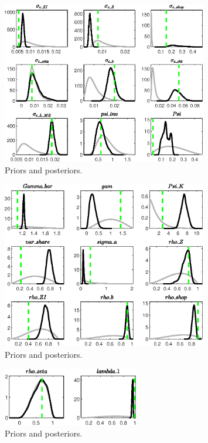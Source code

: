  
\begin{figure}[H]
\centering
\includegraphics[width=0.80\textwidth]{directed_search/Output/directed_search_PriorsAndPosteriors1}
\caption{Priors and posteriors.}\label{Fig:PriorsAndPosteriors:1}
\end{figure}
 
\begin{figure}[H]
\centering
\includegraphics[width=0.80\textwidth]{directed_search/Output/directed_search_PriorsAndPosteriors2}
\caption{Priors and posteriors.}\label{Fig:PriorsAndPosteriors:2}
\end{figure}
 
\begin{figure}[H]
\centering
\includegraphics[width=0.53\textwidth]{directed_search/Output/directed_search_PriorsAndPosteriors3}
\caption{Priors and posteriors.}\label{Fig:PriorsAndPosteriors:3}
\end{figure}
 
